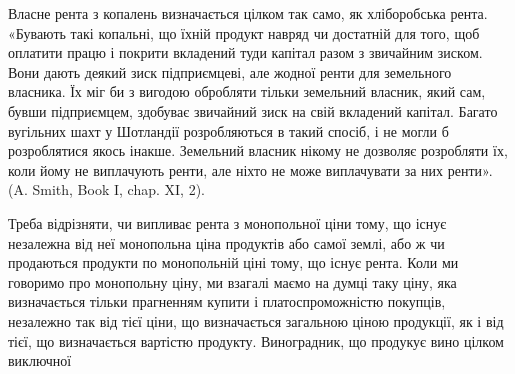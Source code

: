 Власне рента з копалень визначається цілком так само, як хліборобська
рента. «Бувають такі копальні, що їхній продукт навряд чи достатній для того,
щоб оплатити працю і покрити вкладений туди капітал разом з звичайним
зиском. Вони дають деякий зиск підприємцеві, але жодної ренти для земельного
власника. Їх міг би з вигодою обробляти тільки земельний власник, який сам,
бувши підприємцем, здобуває звичайний зиск на свій вкладений капітал. Багато
вугільних шахт у Шотландії розробляються в такий спосіб, і не могли б
розроблятися якось інакше. Земельний власник нікому не дозволяє розробляти
їх, коли йому не виплачують ренти, але ніхто не може виплачувати за них
ренти». (A. Smith, Book I, chap. XI, 2).

Треба відрізняти, чи випливає рента з монопольної ціни тому, що існує
незалежна від неї монопольна ціна продуктів або самої землі, або ж чи продаються
продукти по монопольній ціні тому, що існує рента. Коли ми говоримо
про монопольну ціну, ми взагалі маємо на думці таку ціну, яка визначається
тільки прагненням купити і платоспроможністю покупців, незалежно так від
тієї ціни, що визначається загальною ціною продукції, як і від тієї, що визначається
вартістю продукту. Виноградник, що продукує вино цілком виключної
\parbreak{}  %
